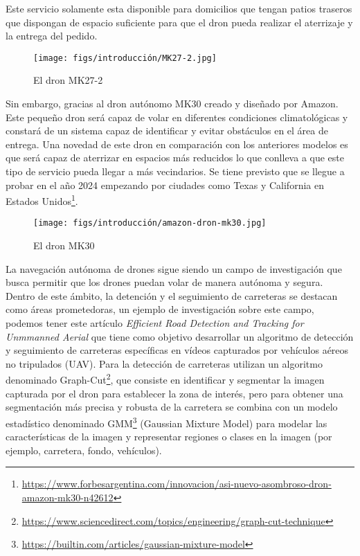 Este servicio solamente esta disponible para domicilios que tengan patios traseros que dispongan de espacio suficiente para que el dron pueda realizar el aterrizaje y la 
entrega del pedido.

\begin{figure} [H]
  \begin{center}
    \texttt{[image: figs/introducción/MK27-2.jpg]}
  \end{center}
  \caption{El dron MK27-2}
  \label{fig:MK27-2}
  \vspace{-1.5em}
\end{figure}

Sin embargo, gracias al dron autónomo MK30 creado y diseñado por Amazon. Este pequeño dron será capaz de volar en diferentes condiciones climatológicas y 
constará de un sistema capaz de identificar y evitar obstáculos en el área de entrega. Una novedad de este dron en comparación con los anteriores modelos es que será capaz de aterrizar en espacios más reducidos lo que conlleva a que
este tipo de servicio pueda llegar a más vecindarios. 
Se tiene previsto que se llegue a probar en el año 2024 empezando por ciudades como Texas y California en Estados Unidos\footnote{\url{https://www.forbesargentina.com/innovacion/asi-nuevo-asombroso-dron-amazon-mk30-n42612}}. 

\begin{figure} [H]
  \begin{center}
    \texttt{[image: figs/introducción/amazon-dron-mk30.jpg]}
  \end{center}
  \caption{El dron MK30}
  \label{fig:MK30}
  \vspace{-1.5em}
\end{figure}

La navegación autónoma de drones sigue siendo un campo de investigación que busca permitir que los drones puedan volar de manera autónoma y segura.
Dentro de este ámbito, la detención y el seguimiento de carreteras se destacan como áreas prometedoras, un ejemplo de investigación sobre este campo, podemos 
tener este artículo \textit{Efficient Road Detection and Tracking for Unmmanned Aerial} \cite{article} que tiene como objetivo desarrollar un algoritmo de detección 
y seguimiento de carreteras específicas en vídeos capturados por vehículos aéreos no tripulados (UAV). Para la detección de carreteras utilizan 
un algoritmo denominado Graph-Cut\footnote{\url{https://www.sciencedirect.com/topics/engineering/graph-cut-technique}}, 
que consiste en identificar y segmentar la imagen capturada por el dron para establecer la zona de interés, pero para obtener una segmentación más precisa y robusta de la carretera 
se combina con un modelo estadístico denominado GMM\footnote{\url{https://builtin.com/articles/gaussian-mixture-model}} (Gaussian Mixture Model) para modelar las características de la imagen y 
representar regiones o clases
en la imagen (por ejemplo, carretera, fondo, vehículos).


